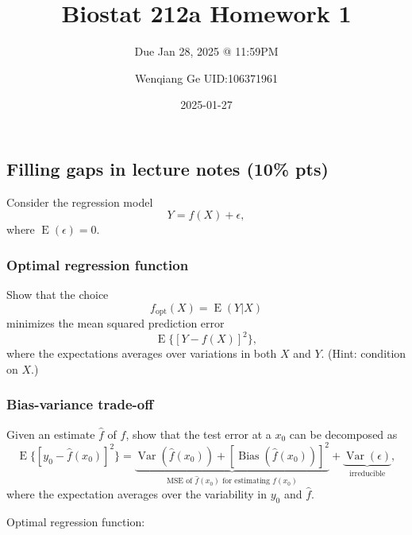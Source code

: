 \documentclass[
]{article}
\title{Biostat 212a Homework 1}
\subtitle{Due Jan 28, 2025 @ 11:59PM}
\author{Wenqiang Ge UID:106371961}
\date{2025-01-27}
\renewcommand*\contentsname{Table of contents}
\newcommand\contentsname{Table of contents}
\begin{document}
\maketitle
\ifdefined\Shaded\renewenvironment{Shaded}{\begin{tcolorbox}[breakable, borderline west={3pt}{0pt}{shadecolor}, frame hidden, enhanced, interior hidden, boxrule=0pt, sharp corners]}{\end{tcolorbox}}\fi

\renewcommand*\contentsname{Table of contents}
{
\hypersetup{linkcolor=}
\setcounter{tocdepth}{2}
\tableofcontents
}
\hypertarget{filling-gaps-in-lecture-notes-10-pts}{%
\subsection{Filling gaps in lecture notes (10\%
pts)}\label{filling-gaps-in-lecture-notes-10-pts}}

Consider the regression model \[
Y = f(X) + \epsilon,
\] where \(\operatorname{E}(\epsilon) = 0\).

\hypertarget{optimal-regression-function}{%
\subsubsection{Optimal regression
function}\label{optimal-regression-function}}

Show that the choice \[
f_{\text{opt}}(X) = \operatorname{E}(Y | X)
\] minimizes the mean squared prediction error \[
\operatorname{E}\{[Y - f(X)]^2\},
\] where the expectations averages over variations in both \(X\) and
\(Y\). (Hint: condition on \(X\).)

\hypertarget{bias-variance-trade-off}{%
\subsubsection{Bias-variance trade-off}\label{bias-variance-trade-off}}

Given an estimate \(\hat f\) of \(f\), show that the test error at a
\(x_0\) can be decomposed as \[
\operatorname{E}\{[y_0 - \hat f(x_0)]^2\} = \underbrace{\operatorname{Var}(\hat f(x_0)) + [\operatorname{Bias}(\hat f(x_0))]^2}_{\text{MSE of } \hat f(x_0) \text{ for estimating } f(x_0)} + \underbrace{\operatorname{Var}(\epsilon)}_{\text{irreducible}},
\] where the expectation averages over the variability in \(y_0\) and
\(\hat f\).

Optimal regression function:
\end{document}
